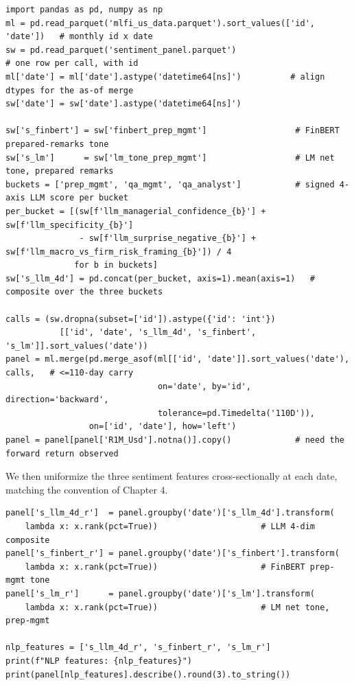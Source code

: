 \begin{verbatim}
import pandas as pd, numpy as np
ml = pd.read_parquet('mlfi_us_data.parquet').sort_values(['id', 'date'])   # monthly id x date
sw = pd.read_parquet('sentiment_panel.parquet')                            # one row per call, with id
ml['date'] = ml['date'].astype('datetime64[ns]')          # align dtypes for the as-of merge
sw['date'] = sw['date'].astype('datetime64[ns]')

sw['s_finbert'] = sw['finbert_prep_mgmt']                  # FinBERT prepared-remarks tone
sw['s_lm']      = sw['lm_tone_prep_mgmt']                  # LM net tone, prepared remarks
buckets = ['prep_mgmt', 'qa_mgmt', 'qa_analyst']           # signed 4-axis LLM score per bucket
per_bucket = [(sw[f'llm_managerial_confidence_{b}'] + sw[f'llm_specificity_{b}']
               - sw[f'llm_surprise_negative_{b}'] + sw[f'llm_macro_vs_firm_risk_framing_{b}']) / 4
              for b in buckets]
sw['s_llm_4d'] = pd.concat(per_bucket, axis=1).mean(axis=1)   # composite over the three buckets

calls = (sw.dropna(subset=['id']).astype({'id': 'int'})
           [['id', 'date', 's_llm_4d', 's_finbert', 's_lm']].sort_values('date'))
panel = ml.merge(pd.merge_asof(ml[['id', 'date']].sort_values('date'), calls,   # <=110-day carry
                               on='date', by='id', direction='backward',
                               tolerance=pd.Timedelta('110D')),
                 on=['id', 'date'], how='left')
panel = panel[panel['R1M_Usd'].notna()].copy()             # need the forward return observed
\end{verbatim}

We then uniformize the three sentiment features cross-sectionally at each date, matching the convention of Chapter 4.

\begin{verbatim}
panel['s_llm_4d_r']  = panel.groupby('date')['s_llm_4d'].transform(
    lambda x: x.rank(pct=True))                     # LLM 4-dim composite
panel['s_finbert_r'] = panel.groupby('date')['s_finbert'].transform(
    lambda x: x.rank(pct=True))                     # FinBERT prep-mgmt tone
panel['s_lm_r']      = panel.groupby('date')['s_lm'].transform(
    lambda x: x.rank(pct=True))                     # LM net tone, prep-mgmt

nlp_features = ['s_llm_4d_r', 's_finbert_r', 's_lm_r']
print(f"NLP features: {nlp_features}")
print(panel[nlp_features].describe().round(3).to_string())
\end{verbatim}

